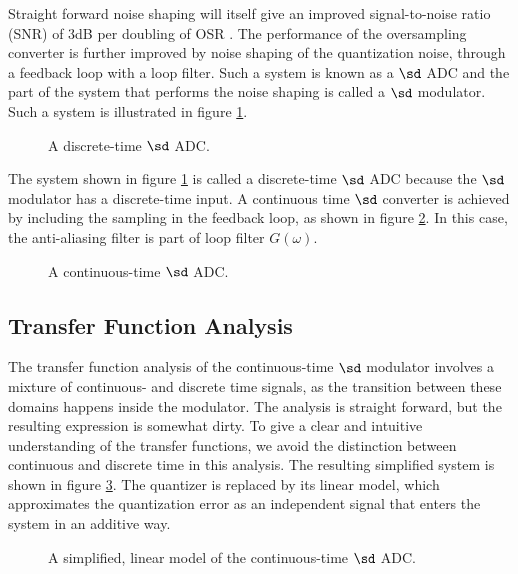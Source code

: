 Straight forward noise shaping will itself give an improved signal-to-noise ratio (SNR) of 3dB per doubling of OSR \cite{johns_martin}. The performance of the oversampling converter is further improved by noise shaping of the quantization noise, through a feedback loop with a loop filter. Such a system is known as a $\sd$ ADC and the part of the system that performs the noise shaping is called a $\sd$ modulator. Such a system is illustrated in figure \ref{fig:dtsdmod}.
\begin{figure}[htbp]
    
    \centering
    \caption{A discrete-time $\sd$ ADC.}
    \label{fig:dtsdmod}
\end{figure}

The system shown in figure \ref{fig:dtsdmod} is called a discrete-time $\sd$ ADC because the $\sd$ modulator has a discrete-time input. A continuous time $\sd$ converter is achieved by including the sampling in the feedback loop, as shown in figure \ref{fig:ctsdmod}. In this case, the anti-aliasing filter is part of loop filter $G(\omega)$.

\begin{figure}[htbp]
    
    \centering
    \caption{A continuous-time $\sd$ ADC.}
    \label{fig:ctsdmod}
\end{figure}

\subsection{Transfer Function Analysis}
\label{sec:ctsd_tf_analysis}
The transfer function analysis of the continuous-time $\sd$ modulator involves a mixture of continuous- and discrete time signals, as the transition between these domains happens inside the modulator. The analysis is straight forward, but the resulting expression is somewhat dirty. To give a clear and intuitive understanding of the transfer functions, we avoid the distinction between continuous and discrete time in this analysis. The resulting simplified system is shown in figure \ref{fig:ctsdmod_lin}. The quantizer is replaced by its linear model, which approximates the quantization error as an independent signal that enters the system in an additive way.
\begin{figure}[htbp]
    
    \centering
    \caption{A simplified, linear model of the continuous-time $\sd$ ADC.}
    \label{fig:ctsdmod_lin}
\end{figure}

